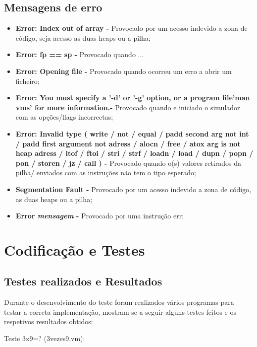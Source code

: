 \documentclass{report}
\begin{document}
\section{Mensagens de erro}

\begin{itemize}
\item \textbf{Error: Index out of array - } Provocado por um acesso indevido a zona de código, seja acesso as duas heaps ou a pilha;
\item \textbf{Error: fp == sp - } Provocado quando ...
\item \textbf{Error: Opening file - } Provocado quando ocorreu um erro a abrir um ficheiro;
\item \textbf{Error: You must specify a '-d' or '-g' option, or a program file\nTry 'man vms' for more information.\n - } Provocado quando e iniciado o simulador
com as opções/flags incorrectas;
\item \textbf{Error: Invalid type ( write / not / equal / padd second arg not int / padd first argument not adress / alocn / free /
 atox arg is not heap adress / itof / ftoi / stri / strf / loadn / load / dupn / popn / pon / storen / jz / call ) - } Provocado
 quando o(s) valores retirados da pilha/ enviados com as instruções não tem o tipo esperado;
\item \textbf{Segmentation Fault - } Provocado por um acesso indevido a zona de código, as duas heaps ou a pilha;
\item \textbf{Error \textit{mensagem} - } Provocado por uma instrução err;
\end{itemize}

\chapter{Codificação e Testes}

\section{Testes realizados e Resultados}
Durante o desenvolvimento do teste foram realizados vários programas para testar a correta implementação, mostram-se
a seguir alguns testes feitos e os respetivos resultados obtidos:\\







\noindent
\par
\begin{Parallel}[v]{0.48\textwidth}{0.48\textwidth}

\quad Teste 3x9=? (3vezes9.vm):
\ParallelPar
\end{Parallel}
\end{document}
